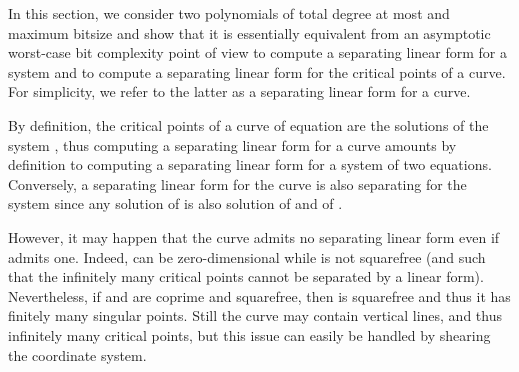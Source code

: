 \documentclass{sig-alternate}
\newcommand{\blue}[1]{\color{blue}#1\color{black}\xspace}
\renewcommand{\blue}[1]{#1\xspace}
\begin{document}
In this section, we consider two polynomials  of total degree at most  and maximum bitsize  and show that it is essentially equivalent from an asymptotic worst-case bit
complexity point of view to compute a separating linear form for a system  and  to compute a
separating linear form for the critical points of a curve.  For simplicity, we refer to the latter
as a separating linear form for a curve.  

By definition, the critical points of a
curve of equation  are the solutions of the system , thus
computing a separating linear form for a curve amounts by definition to computing a
separating linear form for a system of two equations. Conversely, a separating linear form for the curve  is also separating for
the system  since any solution of  is also solution of  and of
. 

However, it may happen that the curve  admits no separating linear form even
if  admits one. Indeed,  can be zero-dimensional while  is
not squarefree (and such that the infinitely many critical points cannot be
separated by a linear form).  Nevertheless, if  and  are coprime and
squarefree, then  is squarefree and thus it has finitely many singular
points.
\blue{Still the curve  may contain vertical lines, and thus infinitely many
critical points, but this issue can easily be handled by shearing the coordinate
system.}
\end{document}
